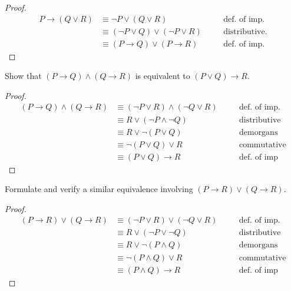 \begin{proof}
\begin{align*}
P \rightarrow (Q \vee R) &\equiv \neg P \vee (Q \vee R) && \quad \text {def. of imp.} \\
&\equiv (\neg P \vee Q) \vee (\neg P \vee R) && \quad \text {distributive.} \\
&\equiv (P \rightarrow Q) \vee (P \rightarrow R) && \quad \text {def. of imp.}
\end{align*}
\end{proof}

\begin{tcolorbox}[title=Problem 7 (a), breakable]
Show that $(P \rightarrow Q) \wedge (Q \rightarrow R)$ is equivalent to 
$(P \vee Q) \rightarrow R$.
\end{tcolorbox}

\begin{proof}
\begin{align*}
(P \rightarrow Q) \wedge (Q \rightarrow R) 
    &\equiv  (\neg P \vee R) \wedge (\neg Q \vee R) && \quad \text {def. of imp.} \\
&\equiv R \vee (\neg P \wedge \neg Q) && \quad \text {distributive} \\
&\equiv R \vee \neg(P \vee Q) && \quad \text {demorgans} \\
&\equiv \neg(P \vee Q) \vee R && \quad \text {commutative} \\
&\equiv (P \vee Q) \rightarrow R && \quad \text {def. of imp}
\end{align*}
\end{proof}

\begin{tcolorbox}[title=Problem 7 (b), breakable]
Formulate and verify a similar equivalence involving 
$(P \rightarrow R) \vee (Q \rightarrow R)$.
\end{tcolorbox}

\begin{proof}
\begin{align*}
(P \rightarrow R) \vee (Q \rightarrow R)
    &\equiv  (\neg P \vee R) \vee (\neg Q \vee R) && \quad \text {def. of imp.} \\
&\equiv R \vee (\neg P \vee \neg Q) && \quad \text {distributive} \\
&\equiv R \vee \neg(P \wedge Q) && \quad \text {demorgans} \\
&\equiv \neg(P \wedge Q) \vee R && \quad \text {commutative} \\
&\equiv (P \wedge Q) \rightarrow R && \quad \text {def. of imp}
\end{align*}
\end{proof}

